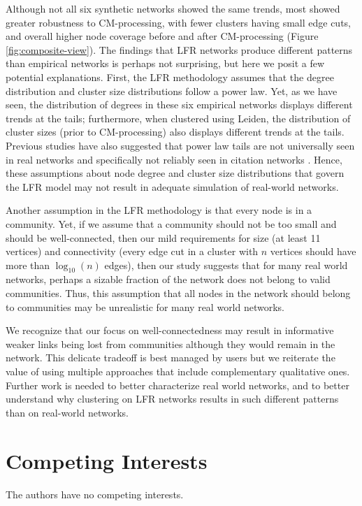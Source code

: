 \documentclass[11pt]{article}   	%
\begin{document}
Although not all six synthetic networks showed the same trends, most showed greater robustness to CM-processing, with fewer clusters having small edge cuts, and overall higher node coverage before and after CM-processing (Figure \ref{fig:composite-view}). The findings that LFR networks produce different patterns than empirical networks is perhaps not surprising, but here we posit a few potential explanations.
First, the LFR methodology assumes that the degree distribution and cluster size distributions follow a power law.
Yet, as we have seen, the distribution of degrees in these six empirical networks displays different trends at the tails; furthermore, when clustered using Leiden, the distribution of cluster sizes (prior to CM-processing) also displays different trends at the tails. Previous studies have also suggested that power law tails are not universally seen in real networks and specifically not reliably seen in citation networks \citep{artico2020rare,brzezinski2015power}. Hence, these assumptions about node degree and cluster size distributions that govern the LFR model may not result in adequate simulation of real-world networks.

Another assumption in the LFR methodology is that every node is in a community.  Yet, if we assume that a community should not be too small and should be well-connected, then
our mild requirements for size (at least 11 vertices) and connectivity (every edge cut in a cluster with $n$ vertices should have more than $\log_{10}(n)$ edges), then our
study suggests that for many real world networks, perhaps a sizable fraction of the network does not belong to valid communities.
Thus, this assumption that all nodes in the network should belong to communities may be unrealistic for many real world networks.

We recognize that our focus on well-connectedness may result in informative weaker links \citep{granovetter1973strength} being lost from communities although they would remain in the network. This delicate tradeoff is best managed by
users but we reiterate the value of using multiple approaches that include complementary qualitative ones. Further work is needed to better characterize real world networks, and to better understand why clustering on LFR networks results in such different patterns than on real-world networks.

\section*{Competing Interests} \vspace{3mm} The authors have no competing interests.
\end{document}
